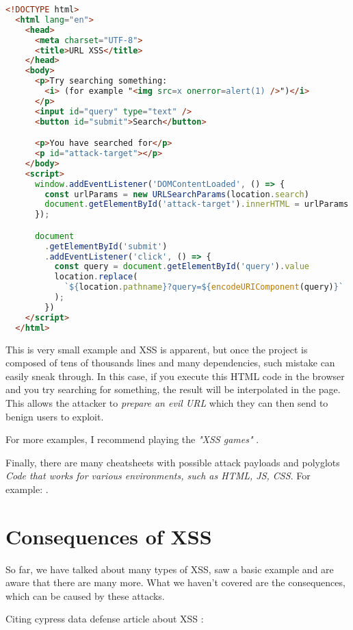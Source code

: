 \begin{lstlisting}[language=HTML]
  <!DOCTYPE html>
  <html lang="en">
    <head>
      <meta charset="UTF-8">
      <title>URL XSS</title>
    </head>
    <body>
      <p>Try searching something:
        <i> (for example "<img src=x onerror=alert(1) />")</i>
      </p>
      <input id="query" type="text" />
      <button id="submit">Search</button>

      <p>You have searched for</p>
      <p id="attack-target"></p>
    </body>
    <script>
      window.addEventListener('DOMContentLoaded', () => {
        const urlParams = new URLSearchParams(location.search)
        document.getElementById('attack-target').innerHTML = urlParams.get('query')
      });

      document
        .getElementById('submit')
        .addEventListener('click', () => {
          const query = document.getElementById('query').value
          location.replace(
            `${location.pathname}?query=${encodeURIComponent(query)}`
          );
        })
    </script>
  </html>
\end{lstlisting}

This is very small example and XSS is apparent, but once the project is composed of tens of
thousands lines and many dependencies, such mistake can easily sneak through. In this case, if you
execute this HTML code in the browser and you try searching for something, the result will be
interpolated in the page. This allows the attacker to \emph{prepare an evil URL} which they can then
send to benign users to exploit.

For more examples, I recommend playing the \emph{"XSS games"} \cite{xss_game_1} \cite{xss_game_2}
\cite{xss_game_3} \cite{xss_game_4}.

Finally, there are many cheatsheets with possible attack payloads and polyglots \emph{Code that
  works for various environments, such as HTML, JS, CSS}. For example: \cite{xss_attack_cheatsheet}.

\section{Consequences of XSS}

So far, we have talked about many types of XSS, saw a basic example and are aware that there are
many more. What we haven't covered are the consequences, which can be caused by these attacks.

Citing cypress data defense article about XSS \cite{cypress_xss_consequences}:

